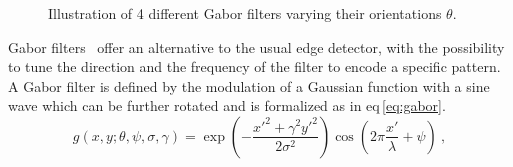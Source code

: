 \begin{figure}
	\hspace*{\fill}
		 \hfill
		 \hfill
		 \hfill
	\hspace*{\fill}
	\caption[Illustration of 4 different Gabor filters.]{Illustration of 4 different Gabor filters varying their orientations $\theta$.}
	\label{fig:gabor}
\end{figure}

Gabor filters~\cite{Gabor1946,Daugman1985} offer an alternative to the usual edge detector, with the possibility to tune the direction and the frequency of the filter to encode a specific pattern. 
A Gabor filter is defined by the modulation of a Gaussian function with a sine wave which can be further rotated and is formalized as in \acs{eq}\,\ref{eq:gabor}.
\begin{equation}
	g(x,y;\theta,\psi,\sigma,\gamma) = \exp \left( - \frac{x'^{2}+ \gamma^{2}y'^{2}}{2 \sigma^{2}} \right) \cos \left( 2 \pi \frac{x'}{\lambda} + \psi \right) \ ,
        \label{eq:gabor}
\end{equation}

